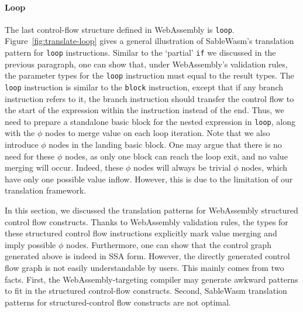 \paragraph{Loop}
The last control-flow structure defined in WebAssembly is \texttt{loop}.
Figure~\ref{fig:translate-loop} gives a general illustration of SableWasm's
translation pattern for \texttt{loop} instructions. Similar to the `partial'
\texttt{if} we discussed in the previous paragraph, one can show that, under
WebAssembly's validation rules, the parameter types for the \texttt{loop}
instruction must equal to the result types. The \texttt{loop} instruction is
similar to the \texttt{block} instruction, except that if any branch
instruction refers to it, the branch instruction should transfer the control
flow to the start of the expression within the instruction instead of the end.
Thus, we need to prepare a standalone basic block for the nested expression in
\texttt{loop}, along with the $\phi$ nodes to merge value on each loop
iteration. Note that we also introduce $\phi$ nodes in the landing basic block.
One may argue that there is no need for these $\phi$ nodes, as only one block
can reach the loop exit, and no value merging will occur. Indeed, these
$\phi$ nodes will always be trivial $\phi$ nodes, which have only one
possible value inflow. However, this is due to the limitation of our translation
framework.

In this section, we discussed the translation patterns for WebAssembly
structured control flow constructs. Thanks to WebAssembly validation rules, the
types for these structured control flow instructions explicitly mark value
merging and imply possible $\phi$ nodes. Furthermore, one can show that the
control graph generated above is indeed in SSA form. However, the directly
generated control flow graph is not easily understandable by users. This mainly
comes from two facts. First, the WebAssembly-targeting compiler may generate
awkward patterns to fit in the structured control-flow constructs. Second,
SableWasm translation patterns for structured-control flow constructs are not
optimal.